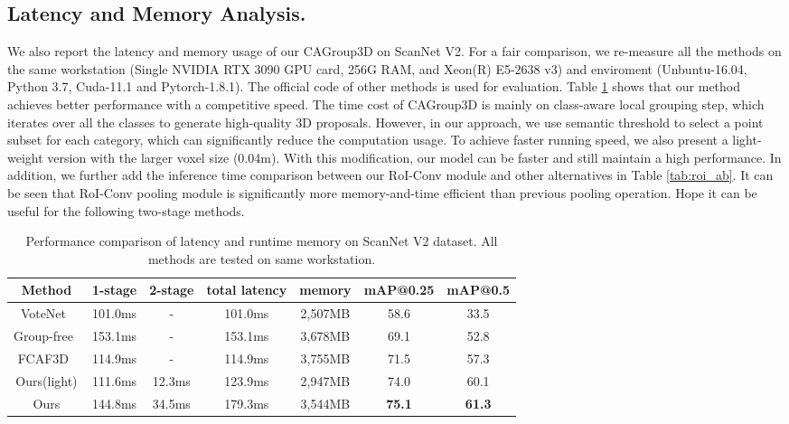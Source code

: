 \documentclass{article}
\begin{document}
\subsection{Latency and Memory Analysis.}
\label{sec:runtime}
We also report the latency and memory usage of our CAGroup3D on ScanNet V2. For a fair comparison, we re-measure all the methods on the same workstation (Single NVIDIA RTX 3090 GPU card, 256G RAM, and Xeon(R) E5-2638 v3) and enviroment (Unbuntu-16.04, Python 3.7, Cuda-11.1 and Pytorch-1.8.1). The official code of other methods is used for evaluation. Table \ref{tab:runtime} shows that our method achieves better performance with a competitive speed. The time cost of CAGroup3D is mainly on class-aware local grouping step, which iterates over all the
classes to generate high-quality 3D proposals. However, in our approach, we use semantic threshold to select a point subset for each category, which can significantly reduce the computation usage. To achieve faster running speed, we also present a light-weight version with the larger voxel size (0.04m). With this modification, our model can be faster and still maintain a high performance. In addition, we further add the inference time comparison between our RoI-Conv module and other alternatives in Table \ref{tab:roi_ab}. It can be seen that RoI-Conv pooling module is significantly more memory-and-time efficient than previous pooling operation. Hope it can be useful for the following two-stage methods.


\begin{table}[h]
  	\caption{Performance comparison of latency and runtime memory on ScanNet V2 dataset. All methods are tested on same workstation.}
  	\label{tab:runtime}
  	\footnotesize
  	\centering
  	\begin{tabular}{ccccccc}
    	\toprule
    	Method  & 1-stage & 2-stage & total latency & memory & mAP@0.25 & mAP@0.5\\
    	\hline
    	VoteNet~\cite{qi2020imvotenet}          & 101.0ms  & - & 101.0ms & 2,507MB  & 58.6 & 33.5   \\
    	Group-free~\cite{liu2021group}           & 153.1ms & -     & 153.1ms   & 3,678MB & 69.1 & 52.8    \\
    	FCAF3D~\cite{rukhovich2021fcaf3d}	   & 114.9ms & -        & 114.9ms   & 3,755MB  & 71.5 & 57.3    \\
    	Ours(light)	     & 111.6ms & 12.3ms     & 123.9ms    & 2,947MB  & 74.0 & 60.1 \\
    	Ours		     & 144.8ms & 34.5ms     & 179.3ms    & 3,544MB  & \textbf{75.1} & \textbf{61.3} \\
    \hline
  	\end{tabular}
\end{table}
\end{document}
